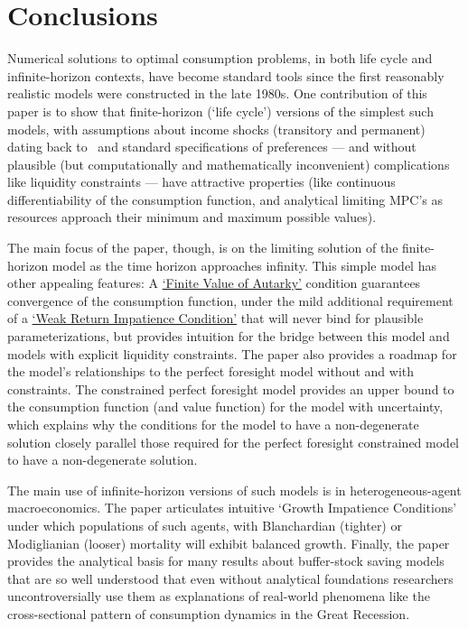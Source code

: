 \documentclass[\econtexRoot/BufferStockTheory]{subfiles}
\begin{document}
\newpage
\hypertarget{Conclusions}{}
\section{Conclusions}

Numerical solutions to optimal consumption problems, in both life cycle and infinite-horizon contexts, have become standard tools since the first reasonably realistic models were constructed in the late 1980s.
One contribution of this paper is to show that finite-horizon (`life cycle') versions of the simplest such models, with assumptions about income shocks (transitory and permanent) dating back to~\cite{friedmanATheory} and standard specifications of preferences --- and without plausible (but computationally and mathematically inconvenient) complications like liquidity constraints --- have attractive properties (like continuous differentiability of the consumption function, and analytical limiting MPC's as resources approach their minimum and maximum possible values).%

The main focus of the paper, though, is on the limiting solution of the finite-horizon model as the time horizon approaches infinity.
This simple model has other appealing features: A \hyperlink{FVAC}{`Finite Value of Autarky'} condition guarantees convergence of the consumption function, under the mild additional requirement of a \hyperlink{WRIC}{`Weak Return Impatience Condition'} that will never bind for plausible parameterizations, but provides intuition for the bridge between this model and models with explicit liquidity constraints.
The paper also provides a roadmap for the model's relationships to the perfect foresight model without and with constraints.
The constrained perfect foresight model provides an upper bound to the consumption function (and value function) for the model with uncertainty, which explains why the conditions for the model to have a non-degenerate solution closely parallel those required for the perfect foresight constrained model to have a non-degenerate solution.

The main use of infinite-horizon versions of such models is in heterogeneous-agent macroeconomics.
The paper articulates intuitive `Growth Impatience Conditions' under which populations of such agents, with Blanchardian (tighter) or Modiglianian (looser) mortality will exhibit balanced growth.
Finally, the paper provides the analytical basis for many results about buffer-stock saving models that are so well understood that even without analytical foundations researchers uncontroversially use them as explanations of real-world phenomena like the cross-sectional pattern of consumption dynamics in the Great Recession.
\end{document}
